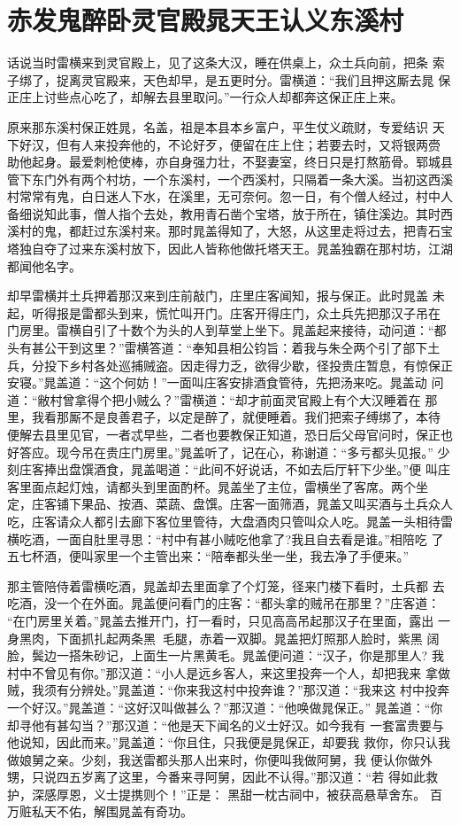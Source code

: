 \chapter{赤发鬼醉卧灵官殿晁天王认义东溪村~}

话说当时雷横来到灵官殿上，见了这条大汉，睡在供桌上，众土兵向前，把条
索子绑了，捉离灵官殿来，天色却早，是五更时分。雷横道：“我们且押这厮去晁
保正庄上讨些点心吃了，却解去县里取问。”一行众人却都奔这保正庄上来。

原来那东溪村保正姓晁，名盖，祖是本县本乡富户，平生仗义疏财，专爱结识
天下好汉，但有人来投奔他的，不论好歹，便留在庄上住；若要去时，又将银两赍
助他起身。最爱刺枪使棒，亦自身强力壮，不娶妻室，终日只是打熬筋骨。郓城县
管下东门外有两个村坊，一个东溪村，一个西溪村，只隔着一条大溪。当初这西溪
村常常有鬼，白日迷人下水，在溪里，无可奈何。忽一日，有个僧人经过，村中人
备细说知此事，僧人指个去处，教用青石凿个宝塔，放于所在，镇住溪边。其时西
溪村的鬼，都赶过东溪村来。那时晁盖得知了，大怒，从这里走将过去，把青石宝
塔独自夺了过来东溪村放下，因此人皆称他做托塔天王。晁盖独霸在那村坊，江湖
都闻他名字。

却早雷横并土兵押着那汉来到庄前敲门，庄里庄客闻知，报与保正。此时晁盖
未起，听得报是雷都头到来，慌忙叫开门。庄客开得庄门，众土兵先把那汉子吊在
门房里。雷横自引了十数个为头的人到草堂上坐下。晁盖起来接待，动问道：“都
头有甚公干到这里？”雷横答道：“奉知县相公钧旨：着我与朱仝两个引了部下土
兵，分投下乡村各处巡捕贼盗。因走得力乏，欲得少歇，径投贵庄暂息，有惊保正
安寝。”晁盖道：“这个何妨！”一面叫庄客安排酒食管待，先把汤来吃。晁盖动
问道：“敝村曾拿得个把小贼么？”雷横道：“却才前面灵官殿上有个大汉睡着在
那里，我看那厮不是良善君子，以定是醉了，就便睡着。我们把索子缚绑了，本待
便解去县里见官，一者忒早些，二者也要教保正知道，恐日后父母官问时，保正也
好答应。现今吊在贵庄门房里。”晁盖听了，记在心，称谢道：“多亏都头见报。”
少刻庄客捧出盘馔酒食，晁盖喝道：“此间不好说话，不如去后厅轩下少坐。”便
叫庄客里面点起灯烛，请都头到里面酌杯。晁盖坐了主位，雷横坐了客席。两个坐
定，庄客铺下果品、按酒、菜蔬、盘馔。庄客一面筛酒，晁盖又叫买酒与土兵众人
吃，庄客请众人都引去廊下客位里管待，大盘酒肉只管叫众人吃。晁盖一头相待雷
横吃酒，一面自肚里寻思：“村中有甚小贼吃他拿了?我且自去看是谁。”相陪吃
了五七杯酒，便叫家里一个主管出来：“陪奉都头坐一坐，我去净了手便来。”

那主管陪侍着雷横吃酒，晁盖却去里面拿了个灯笼，径来门楼下看时，土兵都
去吃酒，没一个在外面。晁盖便问看门的庄客：“都头拿的贼吊在那里？”庄客道：
“在门房里关着。”晁盖去推开门，打一看时，只见高高吊起那汉子在里面，露出
一身黑肉，下面抓扎起两条黑毛腿，赤着一双脚。晁盖把灯照那人脸时，紫黑
阔脸，鬓边一搭朱砂记，上面生一片黑黄毛。晁盖便问道：“汉子，你是那里人?
我村中不曾见有你。”那汉道：“小人是远乡客人，来这里投奔一个人，却把我来
拿做贼，我须有分辨处。”晁盖道：“你来我这村中投奔谁？”那汉道：“我来这
村中投奔一个好汉。”晁盖道：“这好汉叫做甚么？”那汉道：“他唤做晁保正。”
晁盖道：“你却寻他有甚勾当？”那汉道：“他是天下闻名的义士好汉。如今我有
一套富贵要与他说知，因此而来。”晁盖道：“你且住，只我便是晁保正，却要我
救你，你只认我做娘舅之亲。少刻，我送雷都头那人出来时，你便叫我做阿舅，我
便认你做外甥，只说四五岁离了这里，今番来寻阿舅，因此不认得。”那汉道：“若
得如此救护，深感厚恩，义士提携则个！”正是：
黑甜一枕古祠中，被获高悬草舍东。
百万赃私天不佑，解围晁盖有奇功。

